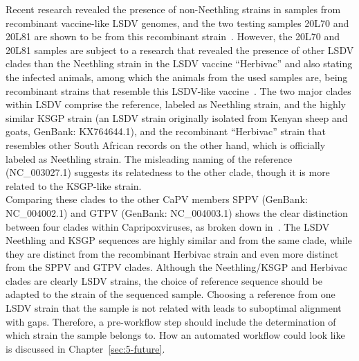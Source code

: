 Recent research revealed the presence of non-Neethling strains in samples from recombinant vaccine-like \ac{LSDV} genomes, and the two testing samples 20L70 and 20L81 are shown to be from this recombinant strain~\cite{vandenbussche2022recombinant}. However, the 20L70 and 20L81 samples are subject to a research that revealed the presence of other \ac{LSDV} clades than the Neethling strain in the LSDV vaccine ``Herbivac'' and also stating the infected animals, among which the animals from the used samples are, being recombinant strains that resemble this \ac{LSDV}-like vaccine~\cite{vandenbussche2022recombinant}. The two major clades within \ac{LSDV} comprise the reference, labeled as Neethling strain, and the highly similar KSGP strain (an \ac{LSDV} strain originally isolated from Kenyan sheep and goats, GenBank: KX764644.1), and the recombinant ``Herbivac'' strain that resembles other South African records on the other hand, which is officially labeled as Neethling strain. The misleading naming of the reference (NC\_003027.1) suggests its relatedness to the other clade, though it is more related to the KSGP-like strain. \\ 
Comparing these clades to the other \ac{CaPV} members \ac{SPPV} (GenBank: NC\_004002.1) and \ac{GTPV} (GenBank: NC\_004003.1) shows the clear distinction between four clades within Capripoxviruses, as broken down in~. The \ac{LSDV} Neethling and KSGP sequences are highly similar and from the same clade, while they are distinct from the recombinant Herbivac strain and even more distinct from the \ac{SPPV} and \ac{GTPV} clades. Although the Neethling/KSGP and Herbivac clades are clearly \ac{LSDV} strains, the choice of reference sequence should be adapted to the strain of the sequenced sample. Choosing a reference from one \ac{LSDV} strain that the sample is not related with leads to suboptimal alignment with gaps. Therefore, a pre-workflow step should include the determination of which strain the sample belongs to. How an automated workflow could look like is discussed in Chapter~\ref{sec:5-future}.\\

